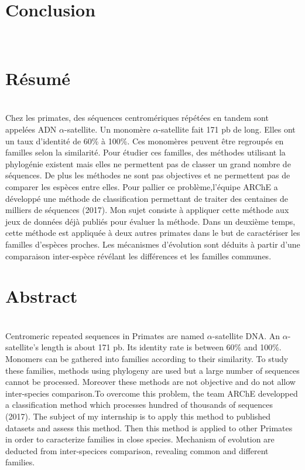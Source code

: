 \documentclass[12pt,a4paper]{article}
\begin{document}
\section{Conclusion}


\newpage
\strut  ~  \mbox{}  \null
\newpage
  

\newpage 
\thispagestyle{empty}
\section*{Résumé}~\\[0.2cm]
Chez les primates, des séquences centromériques répétées en tandem sont appelées ADN $\alpha$-satellite. Un monomère $\alpha$-satellite fait 171 pb de long. Elles ont un taux d'identité de 60\% à 100\%. Ces monomères peuvent être regroupés en familles selon la similarité. Pour étudier ces familles, des méthodes utilisant la phylogénie existent mais elles ne permettent pas de classer un grand nombre de séquences. De plus les méthodes ne sont pas objectives et ne permettent pas de comparer les espèces entre elles. Pour pallier ce problème,l'équipe ARChE a développé une méthode de classification permettant de traiter des centaines de milliers de séquences (2017). Mon sujet consiste à appliquer cette méthode aux jeux de données déjà publiés pour évaluer la méthode. Dans un deuxième temps, cette méthode est appliquée à deux autres primates dans le but de  caractériser les familles d'espèces proches. Les mécanismes d'évolution sont déduits à partir d'une comparaison inter-espèce révélant les différences et les familles communes. 

\section*{Abstract}~\\[0.2cm]
Centromeric repeated sequences in Primates are named $\alpha$-satellite DNA. An $\alpha$-satellite's length is about 171 pb. Its identity rate is between 60\% and 100\%. Monomers can be gathered into families according to their similarity. To study these families, methods using phylogeny are used but a large number of sequences cannot be processed. Moreover these methods are not objective and do not allow inter-species comparison.To overcome this problem, the team ARChE developped a classification method which processes hundred of thousands of sequences (2017). The subject of my internship is to apply this method to published datasets and assess this method. Then this method is applied to other Primates in order to caracterize families in close species. Mechanism of evolution are deducted from inter-specices comparison, revealing common and different families. 
\end{document}
